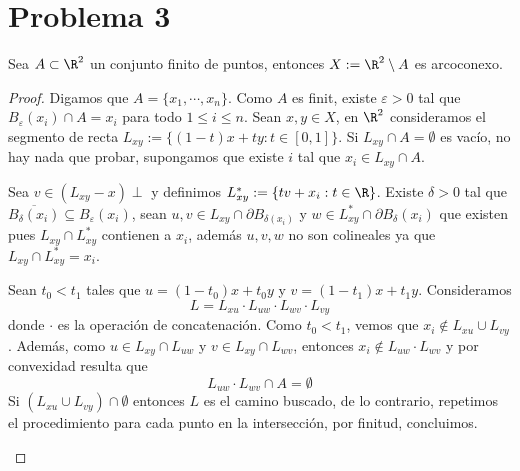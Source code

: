 \documentclass{article}
\begin{document}
\section*{Problema 3}
\begin{lema}
    Sea $A\subset\R^{2}$ un conjunto finito de puntos, entonces $X:=\R^{2}\setminus A$ es 
    arcoconexo.
\end{lema}
\begin{proof}
    Digamos que $A=\{x_{1},\cdots,x_{n}\}$. Como $A$ es finit, existe $\varepsilon>0$ tal que
    $B_{\varepsilon}(x_{i})\cap A=x_{i}$ para todo $1\leq i\leq n$. Sean $x,y\in X$, en $\R^{2}$
    consideramos el segmento de recta $L_{xy}:=\{(1-t)x+ty:t\in[0,1]\}$. Si 
    $L_{xy}\cap A=\emptyset$ es vacío, no hay nada que probar, supongamos que existe $i$ tal que
    $x_{i}\in L_{xy}\cap A$.

    \vspace{2mm}
    \noindent Sea $v\in(L_{xy}-x)\perp$ y definimos $L_{xy}^{*}:=\{tv+x_{i}:t\in\R\}$. Existe 
    $\delta>0$ tal que $\overline{B_{\delta}(x_{i})}\subseteq B_{\varepsilon}(x_{i})$, sean 
    $u,v\in L_{xy}\cap\partial B_{\delta(x_{i})}$ y $w\in L_{xy}^{*}\cap\partial 
    B_{\delta}(x_{i})$ que existen pues $L_{xy}\cap L_{xy}^{*}$ contienen a $x_{i}$, además 
    $u,v,w$ no son colineales ya que $L_{xy}\cap L_{xy}^{*}=x_{i}$.

    \vspace{2mm}
    \noindent Sean $t_{0}<t_{1}$ tales que $u=(1-t_{0})x+t_{0}y$ y $v=(1-t_{1})x+t_{1}y$. 
    Consideramos
    \begin{equation*}
        L=L_{xu}\cdot L_{uw}\cdot L_{wv}\cdot L_{vy}
    \end{equation*}
    donde $\cdot$ es la operación de concatenación. Como $t_{0}<t_{1}$, vemos que 
    $x_{i}\not\in L_{xu}\cup L_{vy}$. Además, como $u\in L_{xy}\cap L_{uw}$ y 
    $v\in L_{xy}\cap L_{wv}$, entonces $x_{i}\not\in L_{uw}\cdot L_{wv}$ y por convexidad resulta
    que
    \begin{equation*}
        L_{uw}\cdot L_{wv}\cap A=\emptyset
    \end{equation*}
    Si $(L_{xu}\cup L_{vy})\cap\emptyset$ entonces $L$ es el camino buscado, de lo contrario, 
    repetimos el procedimiento para cada punto en la intersección, por finitud, concluimos.

    \vspace{2mm}
    \begin{center}
\end{center}
\end{proof}
\end{document}
